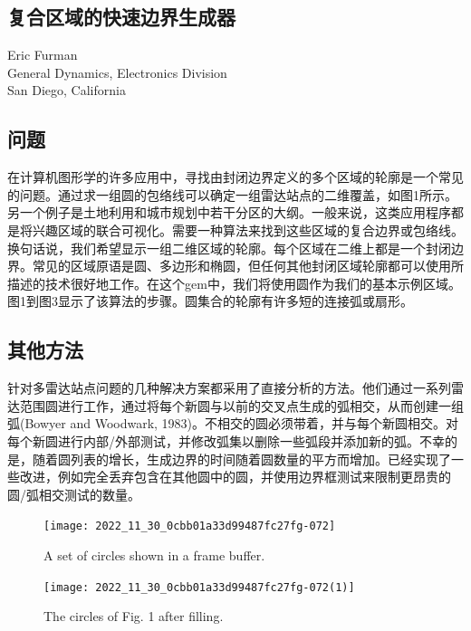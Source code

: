 \begin{CJK}{UTF8}{gbsn}
\newpage
\section{复合区域的快速边界生成器}
\begin{center}
\small{
Eric Furman  \\
General Dynamics, Electronics Division\\
San Diego, California           }
\end{center}

\subsection*{问题}
在计算机图形学的许多应用中，寻找由封闭边界定义的多个区域的轮廓是一个常见的问题。通过求一组圆的包络线可以确定一组雷达站点的二维覆盖，如图1所示。另一个例子是土地利用和城市规划中若干分区的大纲。一般来说，这类应用程序都是将兴趣区域的联合可视化。需要一种算法来找到这些区域的复合边界或包络线。换句话说，我们希望显示一组二维区域的轮廓。每个区域在二维上都是一个封闭边界。常见的区域原语是圆、多边形和椭圆，但任何其他封闭区域轮廓都可以使用所描述的技术很好地工作。在这个gem中，我们将使用圆作为我们的基本示例区域。图1到图3显示了该算法的步骤。圆集合的轮廓有许多短的连接弧或扇形。


\subsection*{其他方法}
针对多雷达站点问题的几种解决方案都采用了直接分析的方法。他们通过一系列雷达范围圆进行工作，通过将每个新圆与以前的交叉点生成的弧相交，从而创建一组弧(Bowyer and Woodwark, 1983)。不相交的圆必须带着，并与每个新圆相交。对每个新圆进行内部/外部测试，并修改弧集以删除一些弧段并添加新的弧。不幸的是，随着圆列表的增长，生成边界的时间随着圆数量的平方而增加。已经实现了一些改进，例如完全丢弃包含在其他圆中的圆，并使用边界框测试来限制更昂贵的圆/弧相交测试的数量。

\begin{figure}
\begin{center}
\texttt{[image: 2022\_11\_30\_0cbb01a33d99487fc27fg-072]}
\end{center}
\caption{A set of circles shown in a frame buffer.}
\end{figure}

\begin{figure}
\begin{center}
\texttt{[image: 2022\_11\_30\_0cbb01a33d99487fc27fg-072(1)]}
\end{center}
\caption{The circles of Fig. 1 after filling.}
\end{figure}



\end{CJK}
